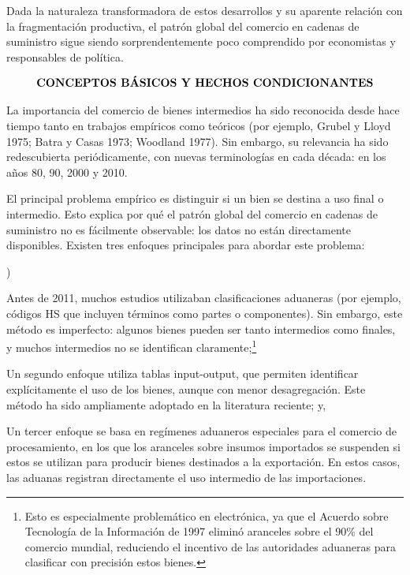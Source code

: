 \documentclass[10pt,a4paper]{article}
\newcounter{alphaitem}
\newenvironment{la}
      {\begin{list}{\alph{alphaitem})}{%
          \usecounter{alphaitem}%
          \setlength{\leftmargin}{1cm}%
          \setlength{\parskip}{3pt}%
          \setlength{\itemsep}{0pt}%
          \setlength{\parsep}{0pt}%
      }}
      {\end{list}}
\begin{document}
Dada la naturaleza transformadora de estos desarrollos y su aparente relación con la fragmentación productiva, el patrón global del comercio en cadenas de suministro sigue siendo sorprendentemente poco comprendido por economistas y responsables de política. 

$$\text{\textbf{CONCEPTOS BÁSICOS Y HECHOS CONDICIONANTES}}$$

La importancia del comercio de bienes intermedios ha sido reconocida desde hace tiempo tanto en trabajos empíricos como teóricos (por ejemplo, Grubel y Lloyd 1975; Batra y Casas 1973; Woodland 1977). Sin embargo, su relevancia ha sido redescubierta periódicamente, con nuevas terminologías en cada década: en los años 80, 90, 2000 y 2010.

El principal problema empírico es distinguir si un bien se destina a uso final o intermedio. Esto explica por qué el patrón global del comercio en cadenas de suministro no es fácilmente observable: los datos no están directamente disponibles. Existen tres enfoques principales para abordar este problema:
\begin{la}
    \item Antes de 2011, muchos estudios utilizaban clasificaciones aduaneras (por ejemplo, códigos HS que incluyen términos como partes o componentes). Sin embargo, este método es imperfecto: algunos bienes pueden ser tanto intermedios como finales, y muchos intermedios no se identifican claramente;\footnote{%
        Esto es especialmente problemático en electrónica, ya que el Acuerdo sobre Tecnología de la Información de 1997 eliminó aranceles sobre el 90\% del comercio mundial, reduciendo el incentivo de las autoridades aduaneras para clasificar con precisión estos bienes.
    }
    \item Un segundo enfoque utiliza tablas input-output, que permiten identificar explícitamente el uso de los bienes, aunque con menor desagregación. Este método ha sido ampliamente adoptado en la literatura reciente; y,
    \item Un tercer enfoque se basa en regímenes aduaneros especiales para el comercio de procesamiento, en los que los aranceles sobre insumos importados se suspenden si estos se utilizan para producir bienes destinados a la exportación. En estos casos, las aduanas registran directamente el uso intermedio de las importaciones.
\end{la}
\end{document}
